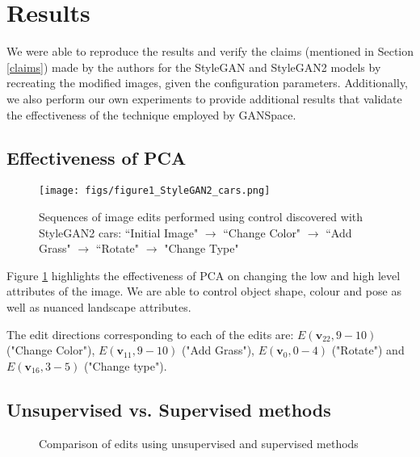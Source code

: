 \section{Results}

We were able to reproduce the results and verify the claims (mentioned in Section \ref{claims}) made by the authors for the StyleGAN and StyleGAN2 models by recreating the modified images, given the configuration parameters. Additionally, we also perform our own experiments to provide additional results that validate the effectiveness of the technique employed by GANSpace.


\subsection{Effectiveness of PCA}

\begin{figure}[H]
    \centering
    \texttt{[image: figs/figure1\_StyleGAN2\_cars.png]}
    \caption{Sequences of image edits performed using control discovered with StyleGAN2 cars: ``Initial Image" $\rightarrow$ ``Change Color" $\rightarrow$ ``Add Grass" $\rightarrow$ ``Rotate" $\rightarrow$ "Change Type"}
    \label{fig:cars}
\end{figure}

Figure \ref{fig:cars} highlights the effectiveness of PCA on changing the low and high level attributes of the image. We are able to control object shape, colour and pose as well as nuanced landscape attributes.

The edit directions corresponding to each of the edits are: $E(\mathbf{v}_{22}, 9-10)$ ("Change Color"), $E(\mathbf{v}_{11}, 9-10)$ ("Add Grass"), $E(\mathbf{v}_{0}, 0-4)$ ("Rotate") and $E(\mathbf{v}_{16}, 3-5)$ ("Change type").

\subsection{Unsupervised vs. Supervised methods}

\begin{figure}[H]


  
  \caption{Comparison of edits using unsupervised and supervised methods}
  \label{fig:faces}
\end{figure}

